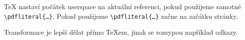 \documentclass[12pt]{article}					%
\begin{document}
        \begin{poznamka}[TeX]
            TeX nastaví počátek userspace na aktuální referenci, pokud použijeme samotné \verb|\pdfliteral{…}|. Pokud použijeme \verb|\pdfliteral{…}| začne na začátku stránky.
        \end{poznamka}

        \begin{upozorneni}
            Transformace je lepší dělat přímo TeXem, jinak se rozsypou například odkazy.
        \end{upozorneni}
\end{document}
